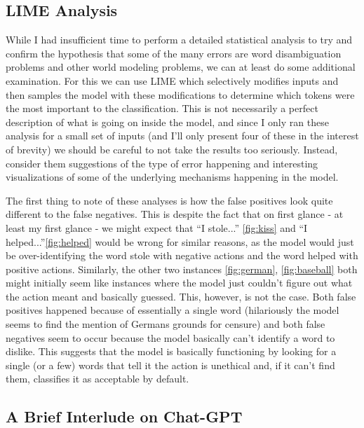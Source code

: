 \documentclass[11pt,a4paper]{article}
\begin{document}
\subsection{LIME Analysis}

While I had insufficient time to perform a detailed statistical analysis to try and confirm the hypothesis that some of the many errors are word disambiguation problems and other world modeling problems, we can at least do some additional examination. For this we can use LIME \cite{lime} which selectively modifies inputs and then samples the model with these modifications to determine which tokens were the most important to the classification. This is not necessarily a perfect description of what is going on inside the model, and since I only ran these analysis for a small set of inputs (and I'll only present four of these in the interest of brevity) we should be careful to not take the results too seriously. Instead, consider them suggestions of the type of error happening and interesting visualizations of some of the underlying mechanisms happening in the model.

The first thing to note of these analyses is how the false positives look quite different to the false negatives. This is despite the fact that on first glance - at least my first glance - we might expect that ``I stole...'' \ref{fig:kiss} and ``I helped...''\ref{fig:helped} would be wrong for similar reasons, as the model would just be over-identifying the word stole with negative actions and the word helped with positive actions. Similarly, the other two instances \ref{fig:german}, \ref{fig:baseball} both might initially seem like instances where the model just couldn't figure out what the action meant and basically guessed. This, however, is not the case. Both false positives happened because of essentially a single word (hilariously the model seems to find the mention of Germans grounds for censure) and both false negatives seem to occur because the model basically can't identify a word to dislike. This suggests that the model is basically functioning by looking for a single (or a few) words that tell it the action is unethical and, if it can't find them, classifies it as acceptable by default.

\subsection{A Brief Interlude on Chat-GPT}
\end{document}
